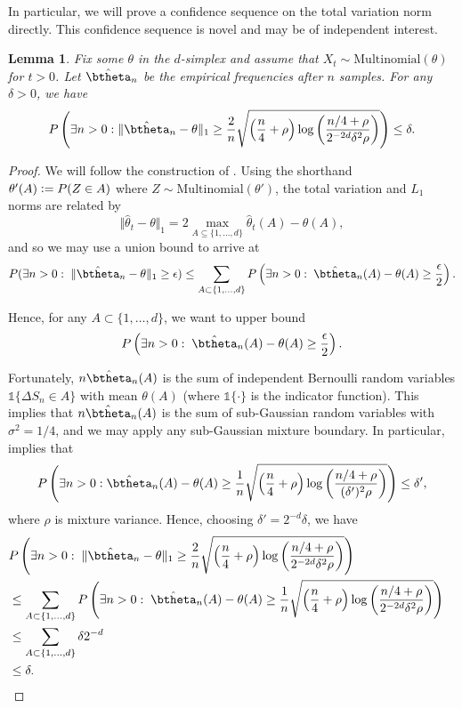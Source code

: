 \documentclass[11pt]{article}
\def\log{{\rm log}}
\newtheorem{lemma}{Lemma}[section]
\newcommand{\df}{\vcentcolon=}
\newcommand{\pfrac}[2]{\left(\frac{#1}{#2}\right)}
\begin{document}
In particular, we will prove a confidence sequence on the total variation norm directly. This confidence sequence is novel and may be of independent interest.
\begin{lemma}\label{lem:CS}
  Fix some $\theta$ in the $d$-simplex and assume that $X_t\sim\mathrm{Multinomial}(\theta)$ for $t>0$. Let $\hat\btheta_n$ be the empirical frequencies after $n$ samples. For any $\delta>0$,  we have
\begin{equation}\label{eqn:multinomial.CS}
  P\left( \exists n > 0: \Vert \hat\btheta_n - \theta\Vert_1
    \geq
  \frac{2}{n}\sqrt{\left(\frac{n}{4} + \rho\right)\log\pfrac{n/4+\rho}{2^{-2d}\delta^2 \rho}} 
  \right)
  \leq \delta.
\end{equation}  
\end{lemma}
\begin{proof}
  We will follow the construction of \cite{weissman2003inequalities}.
  Using the shorthand $\theta'(A) \df P(Z\in  A)$ where $Z\sim\mathrm{Multinomial}(\theta')$, the total variation and $L_1$ norms are related by
\[
  \Vert \hat\theta_t - \theta\Vert_1
  =
  2 \max_{A \subseteq \{1,\ldots, d\}} \hat\theta_t(A) - \theta(A),
\]
and so we may use a union bound to arrive at
\begin{align*}
  P(\exists n > 0:\; \Vert \hat\btheta_n - \theta\Vert_1 \geq \epsilon)
  \leq
  \sum_{A \subset \{1,\ldots, d\}}
  P\left(\exists n > 0:\; \hat\btheta_n(A) - \theta(A) \geq \frac{\epsilon}{2}\right).
\end{align*}

Hence, for any $A \subset \{1,\ldots, d\}$, we want to upper bound
\[
 P\left(\exists n > 0:\; \hat\btheta_n(A) - \theta(A) \geq \frac{\epsilon}{2}\right).
\]

Fortunately, $n \hat\btheta_n(A)$ is the sum of independent Bernoulli random variables $\mathds{1}\{ \Delta S_n \in A\}$ with mean $\theta(A)$ (where $\mathds{1}\{\cdot\}$ is the indicator function). This implies that $n \hat\btheta_n(A)$ is the sum of sub-Gaussian random variables with $\sigma^2 = 1/4$, and we may apply any sub-Gaussian mixture boundary. In particular, \cite[Equation~14]{howard2018uniform} implies that
\[
  P\left(\exists n > 0: \hat\btheta_n(A) - \theta(A) \geq
    \frac{1}{n}\sqrt{\left(\frac{n}{4} + \rho\right)\log\pfrac{n/4+\rho}{(\delta')^2 \rho}}
  \right)
  \leq
  \delta',
\]
where $\rho$ is mixture variance.
Hence, choosing $\delta' = 2^{-d} \delta$, we have
\begin{align*}
  \lefteqn{
  P\left(\exists n > 0:\; \Vert \hat\btheta_n - \theta\Vert_1 \geq
  \frac{2}{n}\sqrt{\left(\frac{n}{4} + \rho\right)\log\pfrac{n/4+\rho}{2^{-2d}\delta^2 \rho}} 
\right)
  }\\
  &\leq
  \sum_{A \subset \{1,\ldots, d\}}
  P\left(\exists n > 0:\; \hat\btheta_n(A) - \theta(A)
  \geq
    \frac{1}{n}\sqrt{\left(\frac{n}{4} + \rho\right)\log\pfrac{n/4+\rho}{2^{-2d}\delta^2 \rho}}  
  \right)\\
  &\leq
    \sum_{A \subset \{1,\ldots, d\}}
    \delta 2^{-d}\\
  &\leq
  \delta.
\end{align*}



\end{proof}
\end{document}
